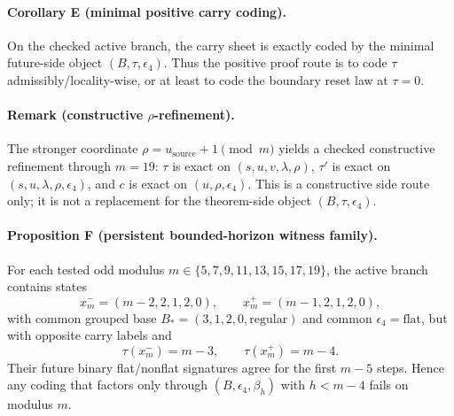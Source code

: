 \paragraph{Corollary E (minimal positive carry coding).}
On the checked active branch, the carry sheet is exactly coded by the minimal
future-side object $(B,\tau,\epsilon_4)$. Thus the positive proof route is to code
$\tau$ admissibly/locality-wise, or at least to code the boundary reset law at
$\tau=0$.

\paragraph{Remark (constructive $\rho$-refinement).}
The stronger coordinate $\rho=u_{\mathrm{source}}+1 \pmod m$ yields a checked
constructive refinement through $m=19$: $\tau$ is exact on $(s,u,v,\lambda,\rho)$,
$\tau'$ is exact on $(s,u,\lambda,\rho,\epsilon_4)$, and $c$ is exact on
$(u,\rho,\epsilon_4)$. This is a constructive side route only; it is not a
replacement for the theorem-side object $(B,\tau,\epsilon_4)$.

\paragraph{Proposition F (persistent bounded-horizon witness family).}
For each tested odd modulus $m\in\{5,7,9,11,13,15,17,19\}$, the active branch
contains states
\[
x^-_m=(m-2,2,1,2,0),
\qquad
x^+_m=(m-1,2,1,2,0),
\]
with common grouped base $B_*=(3,1,2,0,\mathrm{regular})$ and common
$\epsilon_4=\mathrm{flat}$, but with opposite carry labels and
\[
\tau(x^-_m)=m-3,
\qquad
\tau(x^+_m)=m-4.
\]
Their future binary flat/nonflat signatures agree for the first $m-5$ steps.
Hence any coding that factors only through $(B,\epsilon_4,\beta_h)$ with
$h<m-4$ fails on modulus $m$.
